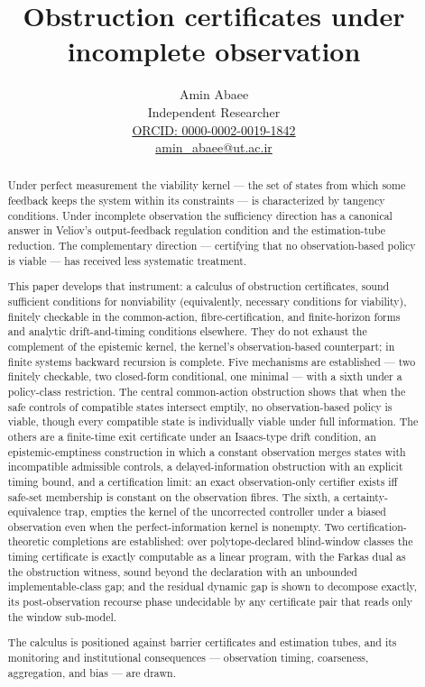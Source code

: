 \documentclass[10pt,twocolumn]{article}
\title{Obstruction certificates under incomplete observation}
\author{Amin Abaee\\[0.35em]
{\small Independent Researcher}\\[0.55em]
{\small\href{https://orcid.org/0000-0002-0019-1842}{ORCID: 0000-0002-0019-1842}}\\[0.3em]
{\small\href{mailto:amin\_abaee@ut.ac.ir}{amin\_abaee@ut.ac.ir}}}
\theoremstyle{definition}
\begin{document}
\maketitle

\begin{abstract}

Under perfect measurement the viability kernel --- the set of states
from which some feedback keeps the system within its constraints --- is
characterized by tangency conditions. Under incomplete observation the
sufficiency direction has a canonical answer in Veliov's
output-feedback regulation condition and the estimation-tube reduction.
The complementary direction --- certifying that no observation-based
policy is viable --- has received less systematic treatment.

This paper develops that instrument: a calculus of obstruction
certificates, sound sufficient conditions for nonviability (equivalently, necessary conditions for viability), finitely
checkable in the common-action, fibre-certification, and finite-horizon forms and analytic drift-and-timing conditions elsewhere. They do not exhaust the complement of the epistemic kernel, the kernel's observation-based counterpart; in finite systems backward recursion is complete. Five mechanisms are established --- two finitely checkable, two
closed-form conditional, one minimal --- with a sixth under a
policy-class restriction. The central common-action obstruction shows
that when the safe controls of compatible states intersect emptily, no
observation-based policy is viable, though every compatible state is
individually viable under full information. The others are a finite-time
exit certificate under an Isaacs-type drift condition, an
epistemic-emptiness construction in which a constant observation merges
states with incompatible admissible controls, a delayed-information
obstruction with an explicit timing bound, and a certification limit:
an exact observation-only certifier exists iff safe-set
membership is constant on the observation fibres. The sixth, a
certainty-equivalence trap, empties the kernel of the uncorrected controller under a biased
observation even when the perfect-information kernel is nonempty.
Two certification-theoretic completions are established: over polytope-declared
blind-window classes the timing certificate is exactly computable as a linear
program, with the Farkas dual as the obstruction witness, sound beyond the
declaration with an unbounded implementable-class gap; and the residual dynamic
gap is shown to decompose exactly, its post-observation recourse phase
undecidable by any certificate pair that reads only the window sub-model.

The calculus is positioned against barrier certificates and estimation
tubes, and its monitoring and institutional consequences ---
observation timing, coarseness, aggregation, and bias --- are drawn.

\end{abstract}
\end{document}
